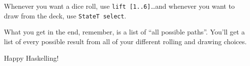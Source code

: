 \documentclass[]{article}
\begin{document}
Whenever you want a dice roll, use \texttt{lift\ {[}1..6{]}}\ldots{}and whenever
you want to draw from the deck, use \texttt{StateT\ select}.

What you get in the end, remember, is a list of ``all possible paths''. You'll
get a list of every possible result from all of your different rolling and
drawing choices.

Happy Haskelling!
\end{document}
